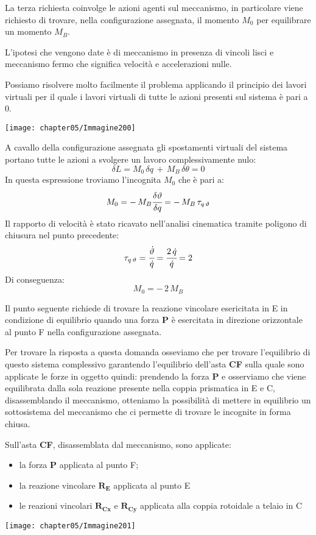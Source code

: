 La terza richiesta coinvolge le azioni agenti sul meccanismo, in particolare viene richiesto di  trovare, nella configurazione assegnata, il momento $M_0$ per equilibrare un momento $M_B$.

\begin{minipage}{.7\textwidth}
L'ipotesi che vengono date è di meccanismo in presenza di vincoli lisci e meccanismo fermo che significa velocità e accelerazioni nulle.

Possiamo risolvere molto facilmente il problema applicando il principio dei lavori virtuali per il quale i lavori virtuali di tutte le azioni presenti sul sistema è pari a 0.
\end{minipage}
\hfill
\begin{minipage}{.25\textwidth}
\centering
\texttt{[image: chapter05/Immagine200]}
\end{minipage}

A cavallo della configurazione assegnata gli spostamenti virtuali del sistema portano tutte le azioni a svolgere un lavoro complessivamente nulo:
\[\delta L = M_0 \,\delta q\,+\,M_B\,\delta \theta = 0\]
In questa espressione troviamo l'incognita $M_0$ che è pari a:
\[M_0 = -\,M_B\cfrac{\delta \theta}{\delta q} = -\,M_B\,\tau_{q\,\theta}\]
Il rapporto di velocità è stato ricavato nell'analisi cinematica tramite poligono di chiusura nel punto precedente:
\[\tau_{q\,\theta} = \cfrac{\dot{\theta}}{\dot{q}} = \cfrac{2\,\dot{q}}{\dot{q}} = 2\]
Di conseguenza:
\[M_0 = -\,2\,M_B\]

Il punto seguente richiede di trovare la reazione vincolare esericitata in E in condizione di equilibrio quando una forza \textbf{P} è esercitata in direzione orizzontale al punto F nella configurazione assegnata.

Per trovare la risposta a questa domanda osseviamo che per trovare l'equilibrio di questo sistema complessivo garantendo l'equilibrio dell'asta \textbf{CF} sulla quale sono applicate le forze in oggetto quindi: prendendo la forza \textbf{P} e osserviamo che viene equilibrata dalla sola reazione presente nella coppia prismatica in E e C, disassemblando il meccanismo, otteniamo la possibilità di mettere in equilibrio un sottosistema del meccanismo che ci permette di trovare le incognite in forma chiusa.

\begin{minipage}{.7\textwidth}
Sull'asta \textbf{CF}, disassemblata dal meccanismo, sono applicate:
\begin{itemize}
\item la forza \textbf{P} applicata al punto F;
\item la reazione vincolare $\mathbf{R_E}$ applicata al punto E 
\item le reazioni vincolari $\mathbf{R_{Cx}}$ e $\mathbf{R_{Cy}}$ applicata alla coppia rotoidale a telaio in C
\end{itemize}
\end{minipage}
\hfill
\begin{minipage}{.25\textwidth}
\centering
\texttt{[image: chapter05/Immagine201]}
\end{minipage}

